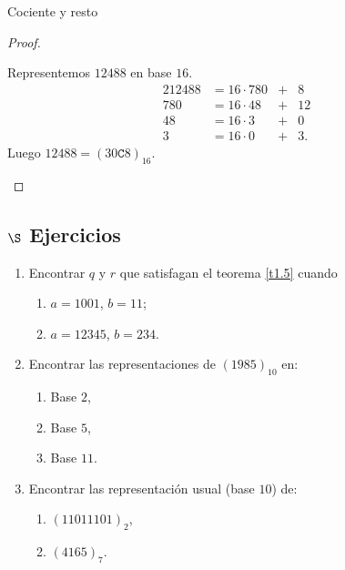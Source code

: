 \begin{section}{Cociente y resto}
\begin{proof}
\begin{ejemplo*} Representemos  $12488$ en  base $16$.
\begin{alignat*}2
12488 &= 16 \cdot 780 &+&  8\\
780 & = 16 \cdot 48 &+& 12\\
48 & = 16\cdot 3 &+& 0\\
3 & = 16 \cdot 0  &+& 3.
\end{alignat*}
Luego $12488 = (30\texttt{C}8)_{16}$.
\end{ejemplo*}


\end{proof}



\subsection*{$\S$ Ejercicios}
\begin{enumerate}
\item Encontrar $q$ y $r$ que satisfagan el teorema \ref{t1.5} cuando
\begin{enumerate}
    \item $a = 1001$, \qquad $b = 11$;
    
    \item $a = 12345$, \qquad $b = 234$.
\end{enumerate}


\item Encontrar las representaciones de $(1985)_{10}$ en:
\begin{enumerate}
    \item Base $2$,
    
    \item Base $5$,
    
    \item Base $11$.
\end{enumerate}

\item  Encontrar las representación usual (base $10$) de:
\begin{enumerate}
    \item $(11011101)_2$,
    
    \item $(4165)_7.$
\end{enumerate}
 
\end{enumerate}
\end{section}


